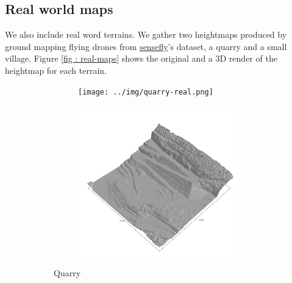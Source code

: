 \documentclass[../document.tex]{subfiles}
\begin{document}
\subsection{Real world maps}
We also include real word terrains. We gather two heightmaps produced by ground mapping flying drones from \href{https://www.sensefly.com/education/datasets/}{sensefly}'s dataset, a quarry and a small village. Figure \ref{fig : real-maps} shows the original and a 3D render of the heightmap for each terrain.
\begin{figure}[htbp]
    \centering
    \begin{subfigure}[b]{1\textwidth}
    \begin{subfigure}[b]{0.45\textwidth}
        \texttt{[image: ../img/quarry-real.png]}
    \end{subfigure}
    \begin{subfigure}[b]{0.45\textwidth}
        \includegraphics[width=\textwidth]{../img/hm3d_borders/querry-big-10.png}
    \end{subfigure}
    \caption{Quarry}
    \label{fig : real-maps-quarry}
\end{subfigure}
\begin{subfigure}[b]{1\textwidth}
    \begin{subfigure}[b]{0.45\textwidth}

\end{subfigure}
\end{subfigure}
\end{figure}
\end{document}
